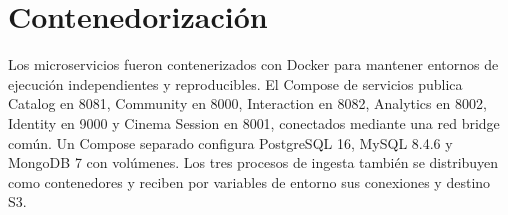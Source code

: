 \chapter{Contenedorización}
Los microservicios fueron contenerizados con Docker para mantener entornos de ejecución independientes y reproducibles. El Compose de servicios publica Catalog en 8081, Community en 8000, Interaction en 8082, Analytics en 8002, Identity en 9000 y Cinema Session en 8001, conectados mediante una red bridge común.
Un Compose separado configura PostgreSQL 16, MySQL 8.4.6 y MongoDB 7 con volúmenes. Los tres procesos de ingesta también se distribuyen como contenedores y reciben por variables de entorno sus conexiones y destino S3.

